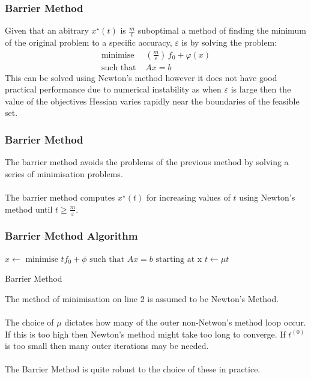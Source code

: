 \documentclass{beamer}
\begin{document}
\begin{frame}
    \frametitle{Barrier Method}
    Given that an abitrary $x^{\star}(t)$ is $\frac{m}{t}$ suboptimal a method of
    finding the minimum of the original problem to a specific accuracy,
    $\varepsilon$ is by solving the problem:
    \begin{align*}
        \text{minimise } \, &\left(\frac{m}{\varepsilon}\right)\,f_{0} +
        \varphi(x)\\
        \text{such that } & Ax =b
    \end{align*}
    This can be solved using Newton's method however it does not have good
    practical performance due to numerical instability as when  $\varepsilon$
    is large then the value of the objectives Hessian varies rapidly near the
    boundaries of the feasible set.
\end{frame}

\begin{frame}
    \frametitle{Barrier Method}
    The barrier method avoids the problems of the previous method by solving a
    series of minimisation problems.
    \\~\\
    The barrier method computes $x^{\star}(t)$ for increasing values of
    $t$ using Newton's method until $t \geq \frac{m}{\varepsilon}$.
\end{frame}


\begin{frame}
    \frametitle{Barrier Method Algorithm}
    \begin{algorithm}[H]
        \begin{algorithmic}[1]
            \STATE $x \leftarrow \text{ minimise } tf_{0} + \phi
            \text{ such that } Ax = b \text{ starting at x}$
            \STATE $t \leftarrow \mu t$
            \ENDWHILE
        \end{algorithmic}
        \caption{Barrier Method}
        \label{alg:seq}
    \end{algorithm}
    The method of minimisation on line 2 is assumed to be Newton's Method.
    \\~\\
    The choice of $\mu$ dictates how many of the outer non-Netwon's method loop
    occur. If this is too high then Newton's method might take too long to
    converge. If $t^{(0)}$ is too small then many outer iterations may be
    needed.
    \\~\\
    The Barrier Method is quite robust to the choice of these in practice.
\end{frame}
\end{document}
